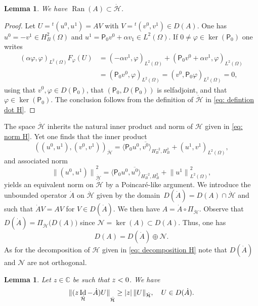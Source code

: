 \documentclass[10pt]{amsart}
\theoremstyle{plain}
\newtheorem{lemma}[theorem]{Lemma}
\theoremstyle{definition}
\def\C{\mathbb{C}}
\let \Re \relax
\DeclareMathOperator{\Re}{Re}
\newcommand{\ovl}[1]{\overline{#1}}
\newcommand{\inp}[2]{(#1, #2)}
\newcommand{\dup}[2]{\langle #1 , #2 \rangle}
\renewcommand{\H}{{\mathcal H}}
\newcommand{\transp}{\ensuremath{\phantom{}^{t}}}
\newcommand{\Norm}[2]{{\| #1 \|}_{#2}}
\newcommand{\Pell}{\mathsf P_0}
\DeclareMathOperator{\id}{Id}
\DeclareMathOperator{\range}{Ran}
\begin{document}
\begin{lemma}
\label{lemma: stability dot H}
We have $\range(A) \subset \dot{\H}$.
\end{lemma}
\begin{proof}
Let $U = \transp(u^0,u^1)= A V$ with $V= \transp(v^0,v^1) \in
D(A)$. One has $u^0 = -v^1 \in H^2_B (\Omega) $ and $u^1 = \Pell
v^0 + \alpha v_1 \in
L^2(\Omega)$. If $0 \neq \varphi \in \ker(\Pell)$ one writes
\begin{align*}
\inp{\alpha\varphi}{\varphi}_{L^2(\Omega)}
F_{\varphi} (U) &=
\inp{-\alpha v^1}{\varphi}_{L^2(\Omega)}
+ \inp{\Pell v^0 + \alpha v^1}{\varphi}_{L^2(\Omega)}\\
&=\inp{\Pell v^0}{\varphi}_{L^2(\Omega)}
= \inp{v^0}{\Pell \varphi}_{L^2(\Omega)}=0,
\end{align*}
using that $v^0, \varphi \in D(\Pell)$, that $(\Pell, D(\Pell))$ is
selfadjoint, and that $\varphi \in \ker(\Pell)$. The conclusion
follows from the definition of $\dot{\H}$ in \eqref{eq: defintion dot H}.
\end{proof}
The space $\dot{\H}$ inherits the natural inner product and norm of
$\H$ given in \eqref{eq: norm H}.
Yet one finds that the inner product
\begin{equation}
\label{eq: inner product dot H}
\inp{(u^0,u^1)}{(v^0,v^1)}_{\dot \H}
= \dup{\Pell u^0}{\ovl{v^0}}_{H^{-2}_B,H^2_B}
+ \inp{u^1}{v^1}_{L^2(\Omega)},
\end{equation}
and associated norm
\begin{equation}
\label{eq: norm dot H}
\Norm{(u^0,u^1)}{\dot \H}^2
= \dup{\Pell u^0}{\ovl{u^0}}_{H^{-2}_B,H^2_B} + \Norm{u^1}{L^2(\Omega)}^2,
\end{equation}
yields an equivalent norm on $\dot \H$ by a Poincaré-like argument.
We introduce the unbounded operator
$\dot{A}$ on $\dot{\H}$ given by the domain~\hbox{$D(\dot{A}) = D(A) \cap \dot{\H}$}
and such that $\dot{A} V = A V$ for $V \in D(\dot{A})$. We then have
$ A= \dot{A}\circ \Pi_{\dot \H}$.
Observe that $D(\dot{A}) = \Pi_{\dot \H} \big(D(A)\big)$ since
$\mathcal N = \ker(A) \subset D(A)$. Thus,
one has
\begin{equation}
\label{eq: decomposition D(A)}
D(A) =D(\dot{A}) \oplus {\mathcal N}.
\end{equation}
As for the decomposition of $\H$ given in \eqref{eq: decomposition H}
note that $D(\dot{A})$ and ${\mathcal N}$ are not orthogonal.

\begin{lemma}
\label{lemma: a priori resolvent estimate}
Let $z \in \C$ be such that $\Re z<0$. We have
\begin{equation*}
\Norm{(z \id_{\dot{\H}} - \dot A) U}{\dot{\H}} \geq |\Re z| \,
\Norm{U}{\dot{\H}}, \quad U \in D(\dot A).
\end{equation*}
\end{lemma}
\end{document}

